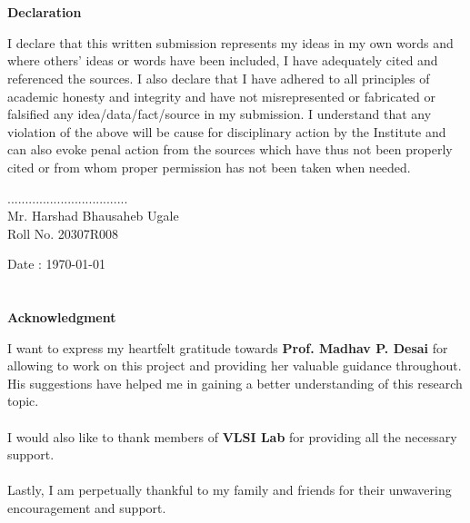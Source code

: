 \documentclass[12pt]{report}
\begin{document}
\chapter*{}
\begin{center}
{\Large \textbf{Declaration}}
\end{center}
\bigskip
\bigskip
\bigskip
I declare that this written submission represents my ideas in my own words and where
others' ideas or words have been included, I have adequately cited and referenced the sources.  
I also declare that I have adhered to all principles of academic honesty and integrity
and   have   not   misrepresented   or   fabricated   or   falsified   any   idea/data/fact/source   in   my
submission.  I understand that any violation of the above will be cause for disciplinary action
by the Institute and can also evoke  penal action from the sources which have thus not been
properly cited or from whom proper permission has not been taken when needed.\\
\bigskip
\bigskip
\bigskip
\begin{flushleft}
..................................\\
{Mr. Harshad Bhausaheb Ugale\\
Roll No. 20307R008}
\end{flushleft}

\begin{flushleft}
{Date : \today}
\end{flushleft}

\newpage

\chapter*{}
\begin{center}
{\Large \textbf{Acknowledgment}}
\end{center}
I want to express my heartfelt gratitude towards \textbf{Prof. Madhav P. Desai} for allowing to work on this project and providing her valuable guidance throughout. His suggestions have helped me in gaining a better understanding of this research topic.\\\\
I would also like to thank members of \textbf{VLSI Lab} for providing all the necessary support.\\\\
Lastly, I am perpetually thankful to my family and friends for their unwavering encouragement and support.
\end{document}

